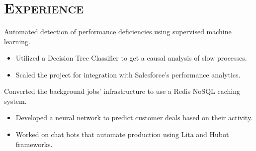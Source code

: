 \begin{resume}
  \begin{formatb}
    \\
    \\
    \body\\
  \end{formatb}

  \section{\textsc{Experience}}

  \begin{position}
    Automated detection of performance deficiencies using supervised machine learning.
    \begin{itemize}
      \setlength\itemsep{0em}
      \item Utilized a Decision Tree Classifier to get a causal analysis of slow processes.
      \item Scaled the project for integration with Salesforce's performance analytics.
    \end{itemize}
  \end{position}

  \begin{position}
    Converted the background jobs' infrastructure to use a Redis NoSQL caching system.
    \begin{itemize}
      \setlength\itemsep{0em}
      \item Developed a neural network to predict customer deals based on their activity.
      \item Worked on chat bots that automate production using Lita and Hubot frameworks.
    \end{itemize}
  \end{position}


\end{resume}
